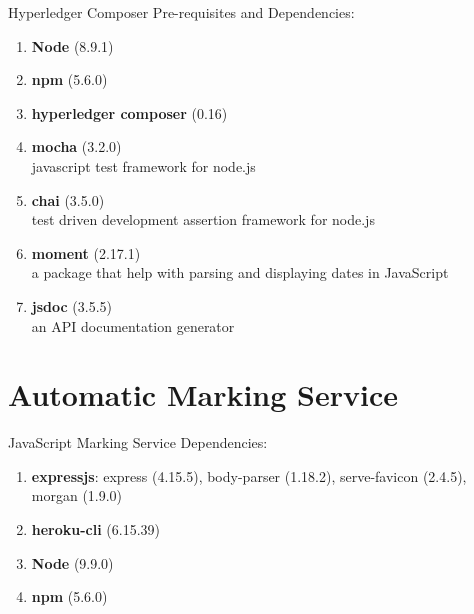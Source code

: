 Hyperledger Composer Pre-requisites and Dependencies:

\begin{enumerate}
	\setlength\itemsep{0em}
	\item \textbf{Node} (8.9.1)
	\item \textbf{npm} (5.6.0)
	\item \textbf{hyperledger composer} (0.16)
	\item \textbf{mocha} (3.2.0)\\
	      javascript test framework for node.js
	\item \textbf{chai} (3.5.0)\\
	      test driven development assertion framework for node.js
	\item \textbf{moment} (2.17.1)\\
	      a package that help with parsing and displaying dates in JavaScript
	\item \textbf{jsdoc} (3.5.5)\\
	      an API documentation generator
\end{enumerate}

\section{Automatic Marking Service}

JavaScript Marking Service Dependencies:

\begin{enumerate}
	\setlength\itemsep{0em}	
	\item \textbf{expressjs}: express (4.15.5), body-parser (1.18.2), serve-favicon (2.4.5), morgan (1.9.0)
	\item \textbf{heroku-cli} (6.15.39)
	\item \textbf{Node} (9.9.0)
	\item \textbf{npm} (5.6.0)
\end{enumerate}
